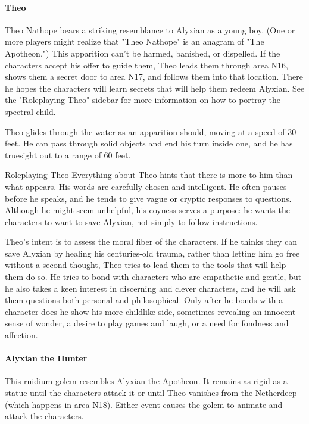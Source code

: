 \documentclass[10pt,a4paper,twoside,twocolumn,openany,nodeprecatedcode]{dndbook}
\begin{document}
\paragraph{Theo}
Theo Nathope bears a striking resemblance to Alyxian as a young boy. (One or more players might realize that "Theo Nathope" is an anagram of "The Apotheon.") This apparition can't be harmed, banished, or dispelled. If the characters accept his offer to guide them, Theo leads them through area N16, shows them a secret door to area N17, and follows them into that location. There he hopes the characters will learn secrets that will help them redeem Alyxian. See the "Roleplaying Theo" sidebar for more information on how to portray the spectral child.

Theo glides through the water as an apparition should, moving at a speed of 30 feet. He can pass through solid objects and end his turn inside one, and he has truesight out to a range of 60 feet.

\begin{DndSidebar}[float=!b]{Roleplaying Theo}
Everything about Theo hints that there is more to him than what appears. His words are carefully chosen and intelligent. He often pauses before he speaks, and he tends to give vague or cryptic responses to questions. Although he might seem unhelpful, his coyness serves a purpose: he wants the characters to want to save Alyxian, not simply to follow instructions.



Theo's intent is to assess the moral fiber of the characters. If he thinks they can save Alyxian by healing his centuries-old trauma, rather than letting him go free without a second thought, Theo tries to lead them to the tools that will help them do so. He tries to bond with characters who are empathetic and gentle, but he also takes a keen interest in discerning and clever characters, and he will ask them questions both personal and philosophical. Only after he bonds with a character does he show his more childlike side, sometimes revealing an innocent sense of wonder, a desire to play games and laugh, or a need for fondness and affection.



\end{DndSidebar}

\paragraph{Alyxian the Hunter}
This ruidium golem resembles Alyxian the Apotheon. It remains as rigid as a statue until the characters attack it or until Theo vanishes from the Netherdeep (which happens in area N18). Either event causes the golem to animate and attack the characters.
\end{document}
